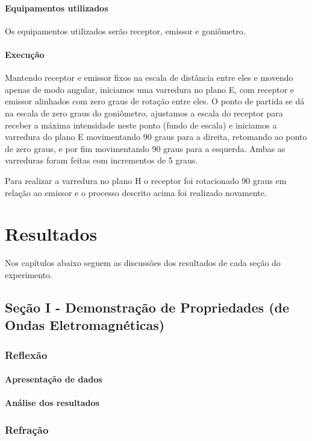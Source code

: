 \documentclass[12pt]{article}
\begin{document}
\paragraph{Equipamentos utilizados}
Os equipamentos utilizados serão receptor, emissor e goniômetro.

\paragraph{Execução}
Mantendo receptor e emissor fixos na escala de distância entre eles e
movendo apenas de modo angular, iniciamos uma varredura no plano E,
com receptor e emissor alinhados com zero graus de rotação entre
eles. O ponto de partida se dá na escala de zero graus do goniômetro,
ajustamos a escala do receptor para receber a máxima intensidade
neste ponto (fundo de escala) e iniciamos a varredura do plano E
movimentando 90 graus para a direita, retomando ao ponto de zero
graus, e por fim movimentando 90 graus para a esquerda. Ambas as
varreduras foram feitas com incrementos de 5 graus.

Para realizar a varredura no plano H o receptor foi rotacionado 90
graus em relação ao emissor e o processo descrito acima foi realizado novamente.

\section{Resultados}
Nos capítulos abaixo seguem as discussões dos resultados de cada
seção do experimento.

\subsection{Seção I - Demonstração de Propriedades (de Ondas Eletromagnéticas)}
\subsubsection{Reflexão}
\paragraph{Apresentação de dados}
\paragraph{Análise dos resultados}

\subsubsection{Refração}
\end{document}
